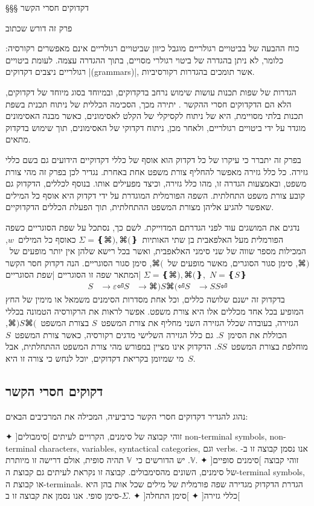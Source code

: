 §§§ דקדוקים חסרי הקשר

פרק זה דורש שכתוב

כוח ההבעה של בביטויים רגולריים מוגבל כיוון שביטויים רגולריים אינם מאפשרים
רקורסיה: כלומר, לא ניתן בהגדרה של ביטוי רגולרי מסויים, בתוך ההגדרה עצמה. לעומת
ביטויים רגולריים ניצבים דקדוקים \E|(grammars)|, אשר תומכים בהגדרות רקורסיביות.

הגדרות של שפות תכנות עושות שימוש נרחב בדקדוקים, ובמיוחד בסוג מיוחד של דקדוקים,
הלא הם הדקדוקים חסרי ההקשר . יתירה מכך, הסכימה
הכללית של ניתוח תכנית בשפת תכנות בלתי מסויימת, היא של ניתוח לקסיקלי של הקלט
לאסימונים, כאשר מבנה האסימונים מוגדר על ידי ביטויים רגולריים, ולאחר מכן, ניתוח
דקדוקי של האסימונים, תוך שימוש בדקדוק מתאים.

בפרק זה יתברר כי עיקרו של כל דקדוק הוא אוסף של כללי דקדוקיים הידועים גם בשם
כללי גזירה. כל כלל גזירה מאפשר להחליף צורת משפט אחת באחרת. נגדיר לכן בפרק זה
מהי צורת משפט, ובאמצעות הגדרה זו, מהו כלל גזירה, וכיצד מפעילים אותו. בנוסף
לכללים, הדקדוק גם קובע צורת משפט התחלתית. השפה הפורמלית המוגדרת על ידי דקדוק
היא אוסף כל המילים שאפשר להגיע אליהן מצורת המשפט ההתחלתית, תוך הפעלת הכללים
הדקדוקיים.

נדגים את המושגים עוד לפני הגדרתם המדוייקת. לשם כך, נסתכל על שפת הסוגריים כשפה
הפורמלית מעל האלפאבית בן שתי האותיות~$Σ=❴⌘), ⌘(❵$ כאוסף כל המילים~$w$,
המכילות מספר שווה
של שני סימני האלאפבית, ואשר בכל רישא שלהן אין יותר מופעים של~$⌘)$, סימן סגור
הסוגרים, מאשר מופעים של~$⌘($, סימן סגור הסוגריים.
הנה דקדוק חסר הקשר המתאר שפה זו
הסוגריים |שפת הסוגריים|
$Σ=❴⌘), ⌘(❵$,~$N=❴S❵$
\begin{equation}
  \label{eq:parenthesis}
  \begin{split}
    S &→ε ⏎
    S &→⌘)S⌘(⏎
    S &→SS ⏎
  \end{split}
\end{equation}
בדקדוק זה ישנם שלושה כללים, וכל אחת מסדרות הסימנים משמאל או מימין של החץ המופיע
בכל אחד מכללים אלו היא צורת משפט. אפשר לראות את הרקורסיה הטמונה בכללי
הגזירה, בעובדה שכלל הגזירה השני מחליף את צורת המשפט~$S$ בצורת המשפט~$⌘)S⌘($,
הכוללת את הסימן~$S$. גם כלל הגזירה השלישי מדגים רקורסיה, כאשר צורת המשפט~$S$
מוחלפת בצורת המשפט~$SS$. הדקדוק אינו מציין במפורש מהי צורת המשפט ההתחלתית,
אבל מי שמיומן בקריאת דקדוקים, יוכל לנחש כי צורה זו היא~$S$.

\subsection{דקוקים חסרי הקשר}
נהוג להגדיר דקדוקים חסרי הקשר כרביעיה,
המכילה את המרכיבים הבאים:
\begin{description}
✦ ]סימבולים[ זוהי קבוצה של סימנים, הקרויים לעיתים non-terminal symbols,
non-terminal characters, variables, syntactical categories, וגם verbs.
אנו נסמן קבוצה זו ב-$𝕍$. יש הדורשים כי~$𝕍$ תהיה סופית,
אולם דרישה זו מיותרת.
✦ ]סימנים סופיים[ זוהי קבוצה של סימנים, השונים מהסימבולים. קבוצה זו נקראת
לעיתים גם קבוצת ה-terminal symbols, או קבוצת ה-terminals. הגדרת הדקדוק מגדירה
  שפה פורמלית של מילים שכל אות בהן היא סימן סופי. אנו נסמן את
קבוצה זו ב-$Σ$.
✦ ]כללי גזירה[
✦ ]סימן התחלה[
\end{description}

